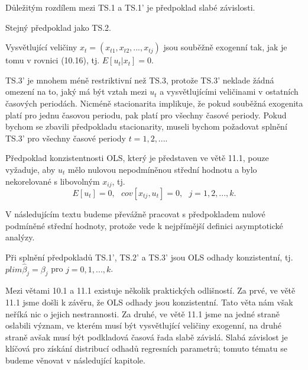 Důležitým rozdílem mezi TS.1 a TS.1' je předpoklad slabé závislosti.

\begin{assumption}
Stejný předpoklad jako TS.2.

\raggedleft{$\clubsuit$}
\end{assumption}

\begin{assumption}
Vysvětlující veličiny $x_t = (x_{t1}, x_{t2}, ..., x_{tj})$ jsou souběžně exogenní tak, jak je tomu v rovnici (10.16), tj. $E[u_t|x_t] = 0$.
  
\raggedleft{$\clubsuit$}
\end{assumption}

TS.3' je mnohem méně restriktivní než TS.3, protože TS.3' neklade žádná omezení na to, jaký má být vztah mezi $u_t$ a vysvětlujícími veličinami v ostatních časových periodách. Nicméně stacionarita implikuje, že pokud souběžná exogenita platí pro jednu časovou periodu, pak platí pro všechny časové periody. Pokud bychom se zbavili předpokladu stacionarity, museli bychom požadovat splnění TS.3' pro všechny časové periody $t = 1, 2, ...$.

Předpoklad konzistentnosti OLS, který je představen ve větě 11.1, pouze vyžaduje, aby $u_t$ mělo nulovou nepodmíněnou střední hodnotu a bylo nekorelované s libovolným $x_{ij}$, tj.
\begin{equation}
E[u_t] = 0, ~~~ cov[x_{tj}, u_t] = 0, ~~~ j = 1, 2, ..., k.
\end{equation}

V následujícím textu budeme převážně pracovat s předpokladem nulové podmíněné střední hodnoty, protože vede k nejpřímější definici asymptotické analýzy.

\begin{theorem}
Při splnění předpokladů TS.1', TS.2' a TS.3' jsou OLS odhady konzistentní, tj. $plim \hat{\beta}_j = \beta_j$ pro $j = 0, 1, ..., k$.
  
\raggedleft{$\clubsuit$}
\end{theorem}

Mezi větami 10.1 a 11.1 existuje několik praktických odlišností. Za prvé, ve větě 11.1 jsme došli k závěru, že OLS odhady jsou konzistentní. Tato věta nám však neříká nic o jejich nestrannosti. Za druhé, ve větě 11.1 jsme na jedné straně oslabili význam, ve kterém musí být vysvětlující veličiny exogenní, na druhé straně avšak musí být podkladová časová řada slabě závislá. Slabá závislost je klíčová pro získání distribucí odhadů regresních parametrů; tomuto tématu se budeme věnovat v následující kapitole.

